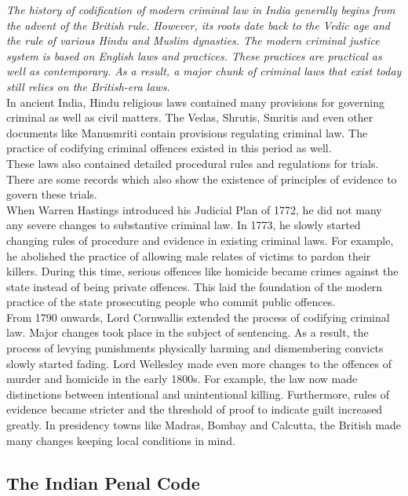 \documentclass[11pt]{article}
\begin{document}
\textit{The history of codification of modern criminal law in India generally begins from the advent of the British rule. However, its roots date back to the Vedic age and the rule of various Hindu and Muslim dynasties. The modern criminal justice system is based on English laws and practices. These practices are practical as well as contemporary. As a result, a major chunk of criminal laws that exist today still relies on the British-era laws.}\\

In ancient India, Hindu religious laws contained many provisions for governing criminal as well as civil matters. The Vedas, Shrutis, Smritis and even other documents like Manusmriti contain provisions regulating criminal law. The practice of codifying criminal offences existed in this period as well.\\

These laws also contained detailed procedural rules and regulations for trials. There are some records which also show the existence of principles of evidence to govern these trials.\\

When Warren Hastings introduced his Judicial Plan of 1772, he did not many any severe changes to substantive criminal law.  In 1773, he slowly started changing rules of procedure and evidence in existing criminal laws. For example, he abolished the practice of allowing male relates of victims to pardon their killers. During this time, serious offences like homicide became crimes against the state instead of being private offences. This laid the foundation of the modern practice of the state prosecuting people who commit public offences.\\

From 1790 onwards, Lord Cornwallis extended the process of codifying criminal law. Major changes took place in the subject of sentencing. As a result, the process of levying punishments physically harming and dismembering convicts slowly started fading. Lord Wellesley made even more changes to the offences of murder and homicide in the early 1800s. For example, the law now made distinctions between intentional and unintentional killing.
Furthermore, rules of evidence became stricter and the threshold of proof to indicate guilt increased greatly. In presidency towns like Madras, Bombay and Calcutta, the British made many changes keeping local conditions in mind.\\

\subsection{The Indian Penal Code}
\end{document}
